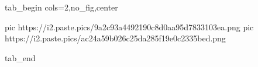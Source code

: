  
 
 
 
 


\ifcmt
  tab_begin cols=2,no_fig,center

     pic https://i2.paste.pics/9a2c93a4492190c8d0aa95d7833103ea.png
		 pic https://i2.paste.pics/ac24a59b026c25da285f19e0c2335bed.png

  tab_end
\fi
